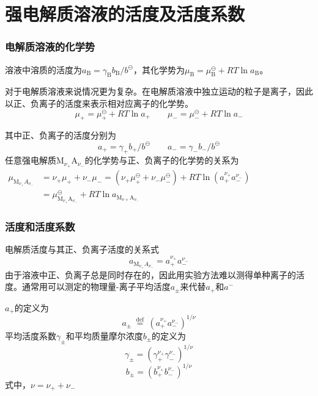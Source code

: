 \documentclass[dvipsnames, svgnames, x11names]{beamer}
\begin{document}
	\section{强电解质溶液的活度及活度系数}


	\begin{frame}
		\frametitle{电解质溶液的化学势}
	
		溶液中溶质的活度为$a_\mathrm{B}=\gamma_\mathrm{B}b_\mathrm{B}/b^\ominus$，其化学势为$\mu_\mathrm{B}=\mu_\mathrm{B}^\ominus + RT \ln a_\mathrm{B}$。
		
		对于电解质溶液来说情况更为复杂。在电解质溶液中独立运动的粒子是离子，因此以正、负离子的活度来表示相对应离子的化学势。
		\[
			\mu_\mathrm{+}=\mu_\mathrm{+}^\ominus + RT \ln a_\mathrm{+} \qquad \mu_\mathrm{-}=\mu_\mathrm{-}^\ominus + RT \ln a_\mathrm{-}
		\]
		
		其中正、负离子的活度分别为
		\[
			a_\mathrm{+}=\gamma_\mathrm{+}b_\mathrm{+}/b^\ominus \qquad a_\mathrm{-}=\gamma_\mathrm{-}b_\mathrm{-}/b^\ominus
		\]
		任意强电解质$\mathrm{M}_{\nu_+}\mathrm{A}_{\nu_-}$的化学势与正、负离子的化学势的关系为
		$\begin{aligned}
			\mu_{\mathrm{M}_{\nu_{+}} A_{\nu_-}} &=\nu_+ \mu_{+}+\nu_-\mu_{-}=(\nu_{+} \mu_{+}^{\ominus}+\nu_{-} \mu_{-}^{\ominus})+R T \ln (a_{+}^{\nu_{+}} a_{-}^{\nu_-}) \\
			&=\mu_{\mathrm{M}_{\nu_{+}} \mathrm{A}_{\nu_-}}^{\ominus}+R T \ln a_{\mathrm{M}_{\nu+} \mathrm{A}_{\nu_-}}
			\end{aligned}$
	
	\end{frame}
	
	
	\begin{frame}
		\frametitle{活度和活度系数}
	
		电解质活度与其正、负离子活度的关系式
		\[
			a_{\mathrm{M}_{\nu_{+}} A_{\nu_-}}=a_{+}^{\nu_{+}} a_{-}^{\nu_-}
		\]
		由于溶液中正、负离子总是同时存在的，因此用实验方法难以测得单种离子的活度。通常用可以测定的物理量-离子平均活度$a_\pm$来代替$a_+$和$a^-$
		
		$a_+$的定义为
		\[
			a_{\pm} \stackrel{\text { def }}{=}(a_{+}^{\nu_{+}} a_{-}^{\nu_-})^{1 / \nu}
		\]
		平均活度系数$\gamma_\pm$和平均质量摩尔浓度$b_\pm$的定义为
		\[
			\gamma_{\pm}=(\gamma_{+}^{\nu_{+}} \gamma_{-}^{\nu_-})^{1 / \nu} 
		\]
		\[
			b_{\pm}=(b_{+}^{\nu_{+}} b_{-}^{\nu_-})^{1 / \nu} 
		\]
		式中，$\nu = \nu_+ + \nu_-$
	
	\end{frame}
	
\end{document}
